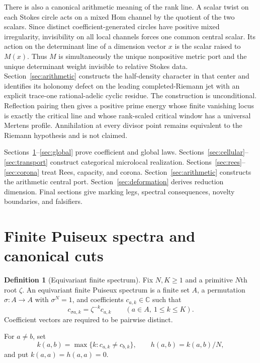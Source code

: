 \documentclass[11pt,a4paper]{amsart}
\theoremstyle{plain}
\theoremstyle{definition}
\newtheorem{definition}[theorem]{Definition}
\newcommand{\CC}{\mathbb C}
\begin{document}
There is also a canonical arithmetic meaning of the rank line.  A scalar twist on each Stokes
circle acts on a mixed Hom channel by the quotient of the two scalars.  Since distinct
coefficient-generated circles have positive mixed irregularity, invisibility on all local channels
forces one common central scalar.  Its action on the determinant line of a dimension vector $x$ is
the scalar raised to $M(x)$.  Thus $M$ is simultaneously the unique nonpositive metric port and the
unique determinant weight invisible to relative Stokes data.  Section~\ref{sec:arithmetic}
constructs the half-density character in that center and identifies its holonomy defect on the
leading completed-Riemann jet with an explicit trace-one rational-adelic cyclic residue.  The
construction is unconditional.  Reflection pairing then gives a positive prime energy whose
finite vanishing locus is exactly the critical line and whose rank-scaled critical window has a
universal Mertens profile.  Annihilation at every divisor point remains equivalent to the Riemann
hypothesis and is not claimed.

Sections~\ref{sec:coefficients}--\ref{sec:global} prove coefficient and global laws.
Sections~\ref{sec:cellular}--\ref{sec:transport} construct categorical microlocal realization.
Sections~\ref{sec:rees}--\ref{sec:corona} treat Rees, capacity, and corona.
Section~\ref{sec:arithmetic} constructs the arithmetic central port.  Section~\ref{sec:deformation}
derives reduction dimension.  Final sections give marking legs, spectral consequences, novelty
boundaries, and falsifiers.

\section{Finite Puiseux spectra and canonical cuts}\label{sec:coefficients}

\begin{definition}[Equivariant finite spectrum]\label{def:spectrum}
Fix $N,K\geq1$ and a primitive $N$th root $\zeta$.  An equivariant finite Puiseux spectrum is a
finite set $A$, a permutation $\sigma:A\to A$ with $\sigma^N=1$, and coefficients
$c_{a,k}\in\CC$ such that
\[
                  c_{\sigma a,k}=\zeta^{-k}c_{a,k}
                  \qquad(a\in A,\ 1\leq k\leq K).
\]
Coefficient vectors are required to be pairwise distinct.
\end{definition}

For $a\ne b$, set
\[
 k(a,b)=\max\{k:c_{a,k}\ne c_{b,k}\},\qquad h(a,b)=k(a,b)/N,
\]
and put $k(a,a)=h(a,a)=0$.
\end{document}
